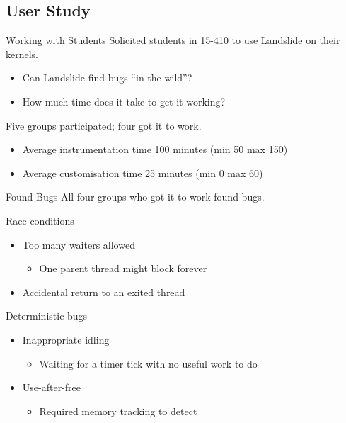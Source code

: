 \documentclass[xcolor=dvipsnames]{beamer}
\begin{document}

\subsection{User Study}

\begin{frame}{Working with Students} %
	Solicited students in 15-410 to use Landslide on their kernels.
	\begin{itemize}
		\item Can Landslide find bugs ``in the wild''?
		\item How much time does it take to get it working?
	\end{itemize}
	Five groups participated; four got it to work.
	\begin{itemize}
		\item Average instrumentation time 100 minutes (min 50 max 150)
		\item Average customisation time 25 minutes (min 0 max 60)
	\end{itemize}
\end{frame}

\begin{frame}{Found Bugs} %
	All four groups who got it to work found bugs.
	
	Race conditions
	\begin{itemize}
		\item Too many waiters allowed
		\begin{itemize}
			\item One parent thread might block forever
		\end{itemize}
		\item Accidental return to an exited thread
	\end{itemize}
	Deterministic bugs
	\begin{itemize}
		\item Inappropriate idling
		\begin{itemize}
			\item Waiting for a timer tick with no useful work to do
		\end{itemize}
		\item Use-after-free
		\begin{itemize}
			\item Required memory tracking to detect
		\end{itemize}
	\end{itemize}
\end{frame}
\end{document}

